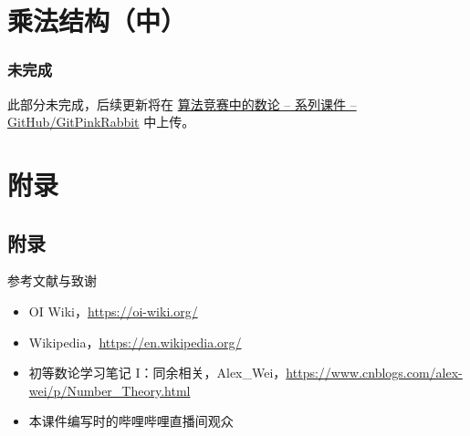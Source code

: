 \documentclass{../pkslide}
\begin{document}
\section{乘法结构（中）}

\begin{frame}
  \frametitle{未完成}
  此部分未完成，后续更新将在 \href{https://github.com/GitPinkRabbit/Number-Theory-in-Competitive-Programming}{算法竞赛中的数论 -- 系列课件 -- GitHub/GitPinkRabbit} 中上传。
\end{frame}

\section{附录}
\subsection*{附录}

\begin{frame}[c]{参考文献与致谢}
  \begin{itemize}
    \item OI Wiki，{\footnotesize\url{https://oi-wiki.org/}}
    \item Wikipedia，{\footnotesize\url{https://en.wikipedia.org/}}
    \item 初等数论学习笔记 I：同余相关，Alex\_Wei，{\footnotesize\url{https://www.cnblogs.com/alex-wei/p/Number_Theory.html}}
    \item 本课件编写时的哔哩哔哩直播间观众
  \end{itemize}
\end{frame}
\end{document}
